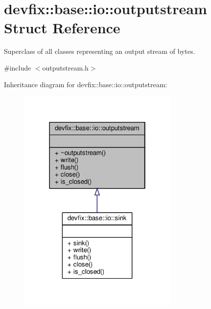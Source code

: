 \hypertarget{structdevfix_1_1base_1_1io_1_1outputstream}{}\section{devfix\+:\+:base\+:\+:io\+:\+:outputstream Struct Reference}
\label{structdevfix_1_1base_1_1io_1_1outputstream}


Superclass of all classes representing an output stream of bytes.  




{\ttfamily \#include $<$outputstream.\+h$>$}



Inheritance diagram for devfix\+:\+:base\+:\+:io\+:\+:outputstream\+:\nopagebreak
\begin{figure}[H]
\begin{center}
\leavevmode
\includegraphics[width=226pt]{structdevfix_1_1base_1_1io_1_1outputstream__inherit__graph}
\end{center}
\end{figure}
